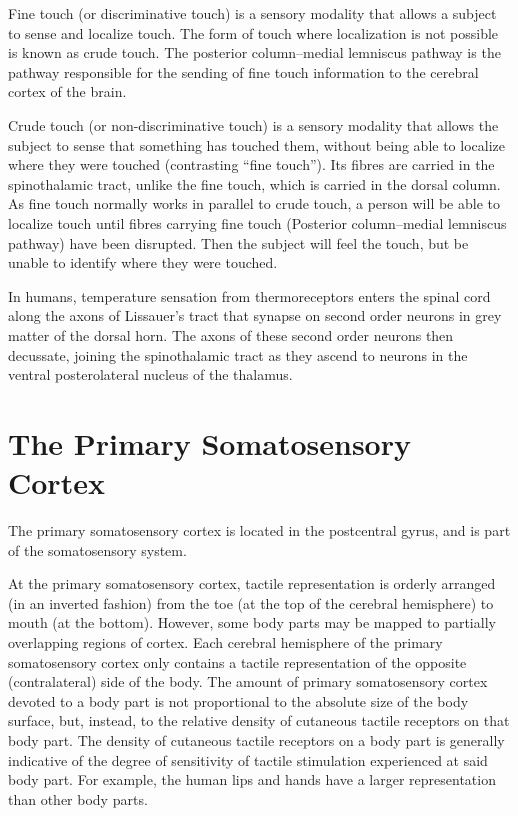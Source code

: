 Fine touch (or discriminative touch) is a sensory modality that allows a subject to sense and localize touch. The form of touch where localization is not possible is known as crude touch. The posterior column--medial lemniscus pathway is the pathway responsible for the sending of fine touch information to the cerebral cortex of the brain.

Crude touch (or non-discriminative touch) is a sensory modality that allows the subject to sense that something has touched them, without being able to localize where they were touched (contrasting ``fine touch''). Its fibres are carried in the spinothalamic tract, unlike the fine touch, which is carried in the dorsal column. As fine touch normally works in parallel to crude touch, a person will be able to localize touch until fibres carrying fine touch (Posterior column--medial lemniscus pathway) have been disrupted. Then the subject will feel the touch, but be unable to identify where they were touched.

In humans, temperature sensation from thermoreceptors enters the spinal cord along the axons of Lissauer's tract that synapse on second order neurons in grey matter of the dorsal horn. The axons of these second order neurons then decussate, joining the spinothalamic tract as they ascend to neurons in the ventral posterolateral nucleus of the thalamus.

\hypertarget{the-primary-somatosensory-cortex}{%
\section{The Primary Somatosensory Cortex}\label{the-primary-somatosensory-cortex}}

The primary somatosensory cortex is located in the postcentral gyrus, and is part of the somatosensory system.

At the primary somatosensory cortex, tactile representation is orderly arranged (in an inverted fashion) from the toe (at the top of the cerebral hemisphere) to mouth (at the bottom). However, some body parts may be mapped to partially overlapping regions of cortex. Each cerebral hemisphere of the primary somatosensory cortex only contains a tactile representation of the opposite (contralateral) side of the body. The amount of primary somatosensory cortex devoted to a body part is not proportional to the absolute size of the body surface, but, instead, to the relative density of cutaneous tactile receptors on that body part. The density of cutaneous tactile receptors on a body part is generally indicative of the degree of sensitivity of tactile stimulation experienced at said body part. For example, the human lips and hands have a larger representation than other body parts.

